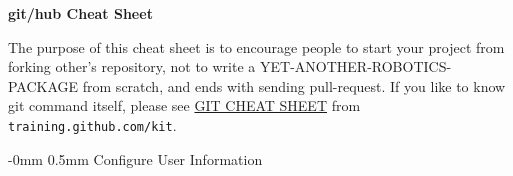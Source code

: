 \documentclass[10pt,landscape]{article}
\makeatletter
\renewcommand{\section}{\@startsection{section}{1}{0mm}%
                                {-0mm} %
                                {0.5mm}%
                                {\normalfont\large\bfseries}}
\makeatother
\begin{document}
\raggedright
\footnotesize
\begin{multicols}{2}


\setlength{\premulticols}{1pt}
\setlength{\postmulticols}{1pt}
\setlength{\multicolsep}{1pt}
\setlength{\columnsep}{2pt}

\begin{center}
     \Large{\textbf{git/hub Cheat Sheet}} \\
\end{center}
\newlength{\MyLen}


The purpose of this cheat sheet is to encourage people to start your
project from forking other's repository, not to write
a YET-ANOTHER-ROBOTICS-PACKAGE from scratch, and ends with sending pull-request.
%
If you like to know git command itself, please see
\href{https://training.github.com/kit/downloads/github-git-cheat-sheet.pdf}{GIT
  CHEAT SHEET} from \texttt{training.github.com/kit}.

\vspace{2.5mm}
\section{Configure User Information}
\vspace{2.5mm}


\end{multicols}
\end{document}
